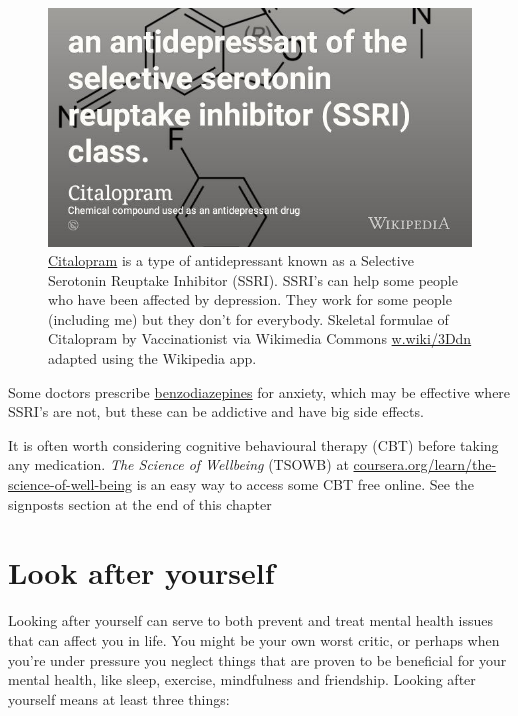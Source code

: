 \documentclass[
]{book}
\begin{document}
\begin{figure}

{\centering \includegraphics[width=0.99\linewidth]{images/citalopram} 

}

\caption{\href{https://www.nhs.uk/medicines/citalopram/}{Citalopram} is a type of antidepressant known as a Selective Serotonin Reuptake Inhibitor (SSRI). SSRI's can help some people who have been affected by depression. They work for some people (including me) but they don't for everybody. Skeletal formulae of Citalopram by Vaccinationist via Wikimedia Commons \href{https://w.wiki/3Ddn}{w.wiki/3Ddn} adapted using the Wikipedia app.}\label{fig:citalopram-fig}
\end{figure}



Some doctors prescribe \href{https://www.mind.org.uk/information-support/drugs-and-treatments/sleeping-pills-and-minor-tranquillisers/about-benzodiazepines/}{benzodiazepines} for anxiety, which may be effective where SSRI's are not, but these can be addictive and have big side effects.

It is often worth considering cognitive behavioural therapy (CBT) before taking any medication. \emph{The Science of Wellbeing} (TSOWB) at \href{https://www.coursera.org/learn/the-science-of-well-being}{coursera.org/learn/the-science-of-well-being} is an easy way to access some CBT free online. See the signposts section at the end of this chapter \citep{lauriesantos}

\hypertarget{lays}{%
\section{Look after yourself}\label{lays}}

Looking after yourself can serve to both prevent and treat mental health issues that can affect you in life. You might be your own worst critic, or perhaps when you're under pressure you neglect things that are proven to be beneficial for your mental health, like sleep, exercise, mindfulness and friendship. Looking after yourself means at least three things:
\end{document}
